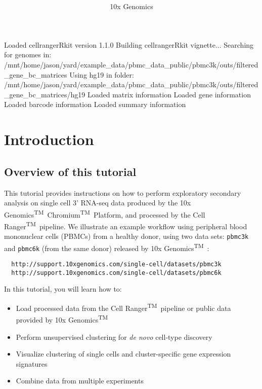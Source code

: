 \documentclass[10pt,oneside]{article}
\title{\textsf{\textbf{\thetitle}}}
\author{10x Genomics\tm}
\newcommand{\tm}{\textsuperscript{\tiny	{TM}}~}
\begin{document}


\maketitle


\tableofcontents

\begin{Schunk}
\begin{Soutput}
Loaded cellrangerRkit version 1.1.0
Building cellrangerRkit vignette...
Searching for genomes in: /mnt/home/jason/yard/example_data/pbmc_data_public/pbmc3k/outs/filtered_gene_bc_matrices 
Using hg19 in folder: /mnt/home/jason/yard/example_data/pbmc_data_public/pbmc3k/outs/filtered_gene_bc_matrices/hg19 
Loaded matrix information
Loaded gene information
Loaded barcode information
Loaded summary information
\end{Soutput}
\end{Schunk}
\vspace{0.5in}
\section{Introduction}
\subsection{Overview of this tutorial}
This tutorial provides instructions on how to perform exploratory secondary analysis on single cell 3' RNA-seq data produced by the 10x Genomics\tm Chromium\tm Platform, and processed by the Cell Ranger\tm pipeline. We illustrate an example workflow using peripheral blood mononuclear cells (PBMCs) from a healthy donor, using two data sets: \verb!pbmc3k! and \verb!pbmc6k! (from the same donor) released by 10x Genomics\tm:
{\color{Violet}
\begin{verbatim}
  http://support.10xgenomics.com/single-cell/datasets/pbmc3k
  http://support.10xgenomics.com/single-cell/datasets/pbmc6k
\end{verbatim}}
\noindent
In this tutorial, you will learn how to:
\begin{itemize}
\item
Load processed data from the Cell Ranger\tm pipeline or public data provided by 10x Genomics\tm
\item
Perform unsupervised clustering for {\it de novo} cell-type discovery
\item
Visualize clustering of single cells and cluster-specific gene expression signatures
\item
Combine data from multiple experiments
\end{itemize}
\end{document}
